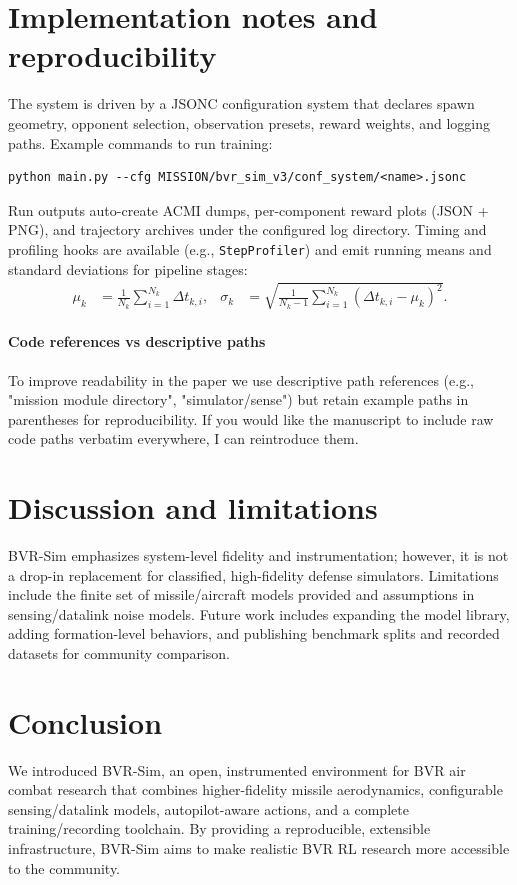 \documentclass[11pt]{article}
\begin{document}
\section{Implementation notes and reproducibility}
The system is driven by a JSONC configuration system that declares spawn geometry, opponent selection, observation presets, reward weights, and logging paths. Example commands to run training:
\begin{verbatim}
python main.py --cfg MISSION/bvr_sim_v3/conf_system/<name>.jsonc
\end{verbatim}
Run outputs auto-create ACMI dumps, per-component reward plots (JSON + PNG), and trajectory archives under the configured log directory. Timing and profiling hooks are available (e.g., \texttt{StepProfiler}) and emit running means and standard deviations for pipeline stages:
\begin{align}
\mu_k &= \frac{1}{N_k}\sum_{i=1}^{N_k}\Delta t_{k,i}, &
\sigma_k &= \sqrt{\frac{1}{N_k-1}\sum_{i=1}^{N_k}(\Delta t_{k,i}-\mu_k)^2}. \label{eq:profiler}
\end{align}

\paragraph{Code references vs descriptive paths} To improve readability in the paper we use descriptive path references (e.g., "mission module directory", "simulator/sense") but retain example paths in parentheses for reproducibility. If you would like the manuscript to include raw code paths verbatim everywhere, I can reintroduce them.

\section{Discussion and limitations}
BVR-Sim emphasizes system-level fidelity and instrumentation; however, it is not a drop-in replacement for classified, high-fidelity defense simulators. Limitations include the finite set of missile/aircraft models provided and assumptions in sensing/datalink noise models. Future work includes expanding the model library, adding formation-level behaviors, and publishing benchmark splits and recorded datasets for community comparison.

\section{Conclusion}
We introduced BVR-Sim, an open, instrumented environment for BVR air combat research that combines higher-fidelity missile aerodynamics, configurable sensing/datalink models, autopilot-aware actions, and a complete training/recording toolchain. By providing a reproducible, extensible infrastructure, BVR-Sim aims to make realistic BVR RL research more accessible to the community.
\end{document}
